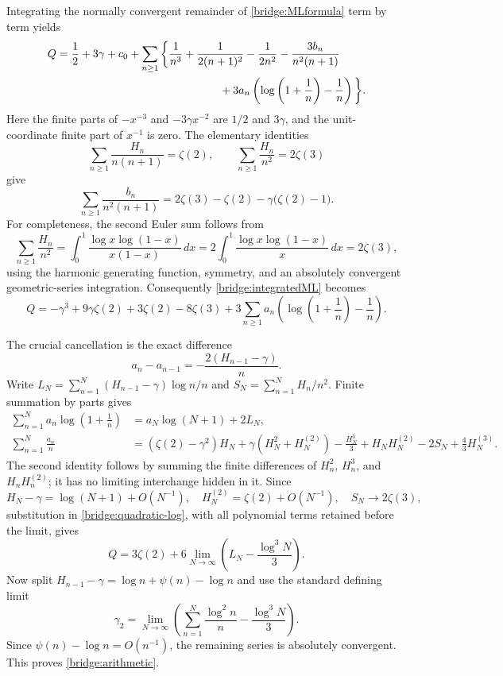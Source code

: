 Integrating the normally convergent remainder of
\eqref{bridge:MLformula} term by term yields
\begin{align}
 Q={}&\frac12+3\gamma+c_0
  +\sum_{n\ge1}\bigg\{
    \frac1{n^3}+\frac1{2(n+1)^2}-\frac1{2n^2}
     -\frac{3b_n}{n^2(n+1)}\notag\\
 &\hspace{47mm}
     +3a_n\left(\log\left(1+\frac1n\right)-\frac1n\right)
     \bigg\}.
 \label{bridge:integratedML}
\end{align}
Here the finite parts of $-x^{-3}$ and $-3\gamma x^{-2}$ are
$1/2$ and $3\gamma$, and the unit-coordinate finite part of
$x^{-1}$ is zero.  The elementary identities
\[
 \sum_{n\ge1}\frac{H_n}{n(n+1)}=\zeta(2),\qquad
 \sum_{n\ge1}\frac{H_n}{n^2}=2\zeta(3)
\]
give
\[
 \sum_{n\ge1}\frac{b_n}{n^2(n+1)}
   =2\zeta(3)-\zeta(2)-\gamma\bigl(\zeta(2)-1\bigr).
\]
For completeness, the second Euler sum follows from
\[
 \sum_{n\ge1}\frac{H_n}{n^2}
 =\int_0^1\frac{\log x\log(1-x)}{x(1-x)}\,dx
 =2\int_0^1\frac{\log x\log(1-x)}x\,dx
 =2\zeta(3),
\]
using the harmonic generating function, symmetry, and an absolutely
convergent geometric-series integration.
Consequently \eqref{bridge:integratedML} becomes
\begin{equation}\label{bridge:quadratic-log}
 Q=-\gamma^3+9\gamma\zeta(2)+3\zeta(2)-8\zeta(3)
  +3\sum_{n\ge1}a_n
       \left(\log\left(1+\frac1n\right)-\frac1n\right).
\end{equation}

The crucial cancellation is the exact difference
\[
 a_n-a_{n-1}=-\frac{2(H_{n-1}-\gamma)}n.
\]
Write
$L_N=\sum_{n=1}^N(H_{n-1}-\gamma)\log n/n$ and
$S_N=\sum_{n=1}^N H_n/n^2$.  Finite summation by parts gives
\begin{align*}
 \sum_{n=1}^N a_n\log\left(1+\frac1n\right)
 &=a_N\log(N+1)+2L_N,\\
 \sum_{n=1}^N\frac{a_n}{n}
 &=(\zeta(2)-\gamma^2)H_N+
      \gamma(H_N^2+H_N^{(2)})-\frac{H_N^3}{3}
       +H_NH_N^{(2)}-2S_N+\frac43H_N^{(3)}.
\end{align*}
The second identity follows by summing the finite differences of
$H_n^2$, $H_n^3$, and $H_nH_n^{(2)}$; it has no limiting
interchange hidden in it.  Since
\[
 H_N-\gamma=\log(N+1)+O(N^{-1}),\quad
 H_N^{(2)}=\zeta(2)+O(N^{-1}),\quad S_N\longrightarrow2\zeta(3),
\]
substitution in \eqref{bridge:quadratic-log}, with all polynomial
terms retained before the limit, gives
\begin{equation}\label{bridge:limit}
 Q=3\zeta(2)+6\lim_{N\to\infty}
       \left(L_N-\frac{\log^3 N}{3}\right).
\end{equation}
Now split $H_{n-1}-\gamma=\log n+\psi(n)-\log n$ and use the
standard defining limit
\[
 \gamma_2=\lim_{N\to\infty}
   \left(\sum_{n=1}^N\frac{\log^2 n}{n}-\frac{\log^3 N}{3}\right).
\]
Since $\psi(n)-\log n=O(n^{-1})$, the remaining series is absolutely
convergent.  This proves \eqref{bridge:arithmetic}.

